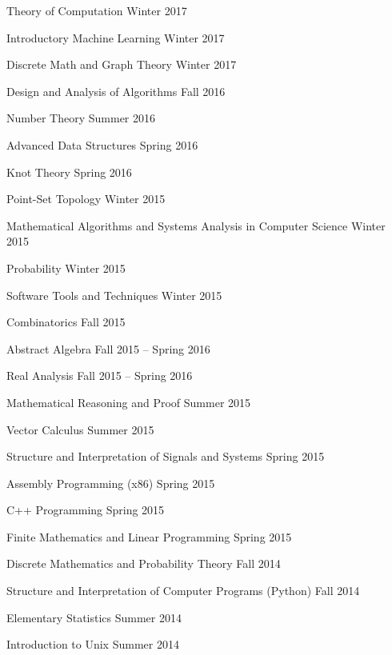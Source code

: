 \documentclass[letterpaper,MMMyyyy,nonstopmode]{simpleresumecv}
\begin{document}
\begin{Body}
\BulletItem
Theory of Computation
\hfill Winter 2017

\BulletItem
Introductory Machine Learning
\hfill Winter 2017

\BulletItem
Discrete Math and Graph Theory
\hfill Winter 2017

\BulletItem
Design and Analysis of Algorithms
\hfill Fall 2016

\BigGap

\BulletItem
Number Theory
\hfill Summer 2016

\BulletItem
Advanced Data Structures
\hfill Spring 2016

\BulletItem
Knot Theory
\hfill Spring 2016

\BulletItem
Point-Set Topology
\hfill Winter 2015

\BulletItem
Mathematical Algorithms and Systems Analysis in Computer Science
\hfill Winter 2015

\BulletItem
Probability
\hfill Winter 2015

\BulletItem
Software Tools and Techniques
\hfill Winter 2015

\BulletItem
Combinatorics
\hfill Fall 2015

\BulletItem
Abstract Algebra
\hfill Fall 2015 -- Spring 2016

\BulletItem
Real Analysis
\hfill Fall 2015 -- Spring 2016

\BigGap

\BulletItem
Mathematical Reasoning and Proof
\hfill Summer 2015

\BulletItem
Vector Calculus
\hfill Summer 2015

\BulletItem
Structure and Interpretation of Signals and Systems
\hfill Spring 2015

\BulletItem
Assembly Programming (x86)
\hfill Spring 2015

\BulletItem
C++ Programming
\hfill Spring 2015

\BulletItem
Finite Mathematics and Linear Programming
\hfill Spring 2015

\BulletItem
Discrete Mathematics and Probability Theory
\hfill Fall 2014

\BulletItem
Structure and Interpretation of Computer Programs (Python)
\hfill Fall 2014

\BigGap

\BulletItem
Elementary Statistics
\hfill Summer 2014

\BulletItem
Introduction to Unix
\hfill Summer 2014


\end{Body}
\end{document}
